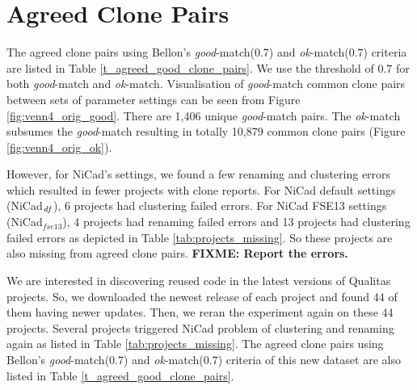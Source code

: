 \documentclass{IEEEtran}
\newcommand\FIXME[1]{\textbf{FIXME: #1}}
\begin{document}
\newpage

\section*{Agreed Clone Pairs}

The agreed clone pairs using Bellon's \textit{good}-match(0.7) and \textit{ok}-match(0.7) criteria are listed in  Table \ref{t_agreed_good_clone_pairs}. We use the threshold of 0.7 for both \textit{good}-match and \textit{ok}-match. Visualisation of \textit{good}-match common clone pairs between sets of parameter settings can be seen from Figure \ref{fig:venn4_orig_good}. There are 1,406 unique \textit{good}-match pairs. The \textit{ok}-match subsumes the \textit{good}-match resulting in totally 10,879 common clone pairs (Figure \ref{fig:venn4_orig_ok}).

However, for NiCad's settings, we found a few renaming and clustering errors which resulted in fewer projects with clone reports. For NiCad default settings (NiCad$_{\textrm{\textit{df}}}$), 6 projects had clustering failed errors. For NiCad FSE13 settings (NiCad$_{fse13}$), 4 projects had renaming failed errors and 13 projects had clustering failed errors as depicted in Table \ref{tab:projects_missing}. So these projects are also missing from agreed clone pairs. \FIXME{Report the errors.}

We are interested in discovering reused code in the latest versions of Qualitas projects. So, we downloaded the newest release of each project and found 44 of them having newer updates. Then, we reran the experiment again on these 44 projects. Several projects triggered NiCad problem of clustering and renaming again as listed in Table \ref{tab:projects_missing}. The agreed clone pairs using Bellon's \textit{good}-match(0.7) and \textit{ok}-match(0.7) criteria of this new dataset are also listed in Table \ref{t_agreed_good_clone_pairs}. 
\end{document}
